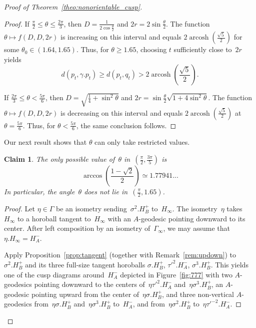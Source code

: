 \documentclass[11pt,reqno]{amsart}
\newtheorem{claim}[theorem]{Claim}
\theoremstyle{definition}
\numberwithin{equation}{section}
\DeclareMathOperator{\arcosh}{arcosh}
\numberwithin{equation}{section}
\begin{document}
\begin{proof}[Proof of Theorem~\ref{theo:nonorientable_cusp}]
\begin{proof}
\medskip

If $\frac{\pi}{2} \leq \theta \leq \frac{2\pi}{3}$, then $D=\frac{1}{2 \cos \frac{\theta}{2}}$ and $2r = 2 \sin \frac{\theta}{2}$.
The function $\theta \mapsto f(D,D,2r)$ is increasing on this interval and equals $2 \arcosh(\frac{\sqrt{5}}{2})$ for some $\theta_0 \in (1.64,1.65)$.
Thus, for $\theta \geq 1.65$, choosing $t$ sufficiently close to~$2r$ yields
\[
d(p_t,\gamma.p_t) \geq d(p_t,q_t) > 2 \arcosh \left( \frac{\sqrt{5}}{2} \right).
\]

If $\frac{2\pi}{3} \leq \theta < \frac{5\pi}{6}$, then $D=\sqrt{\frac{1}{4} + \sin^2 \theta}$ and $2r = \sin \frac{\theta}{2} \sqrt{1+ 4 \sin^2 \theta}$.
The function $\theta \mapsto f(D,D,2r)$ is decreasing on this interval and equals $2 \arcosh(\frac{\sqrt{5}}{2})$ at $\theta = \frac{5\pi}{6}$.
Thus, for $\theta<\frac{5\pi}{6}$, the same conclusion follows.
\end{proof}

Our next result shows that $\theta$ can only take restricted values.


\begin{claim} \label{claim:except2}
The only possible value of~$\theta$ in~$(\frac{\pi}{2},\frac{3\pi}{5})$ is
\[
\arccos\left( \frac{1-\sqrt{2}}{2} \right) \simeq 1.77941...
\]
In particular, the angle~$\theta$ does not lie in~$(\frac{\pi}{2},1.65)$.
\end{claim}



\begin{proof}
Let $\eta \in \Gamma$ be an isometry sending~$\sigma^2.H_B^+$ to~$H_\infty$.
The isometry~$\eta$ takes~$H_\infty$ to a horoball tangent to~$H_\infty$ with an $A$-geodesic pointing downward to its center.
After left composition by an isometry of~$\Gamma_\infty$, we may assume that~$\eta.H_\infty=H_A^-$.

Apply Proposition~\ref{prop:tangent} (together with Remark~\ref{rem:updown}) to $\sigma^2.H_B^+$ and its three full-size tangent horoballs $\sigma.H_B^+$, $\tau'^2.H_A^-$, $\sigma^3.H_B^+$.
This yields one of the cusp diagrams around~$H_A^-$ depicted in Figure~\ref{fig:777} with two $A$-geodesics pointing downward to the centers of~$\eta \tau'^2.H_A^-$ and~$\eta \sigma^3.H_B^+$, an $A$-geodesic pointing upward from the center of~$\eta \sigma.H_B^+$, and three non-vertical $A$-geodesics from~$\eta \sigma.H_B^+$ and~$\eta \sigma^3.H_B^+$ to~$H_A^-$, and from~$\eta \sigma^2.H_B^+$ to~$\eta \tau'^{-2}.H_A^-$.

\medskip



\end{proof}
\end{proof}
\end{document}

